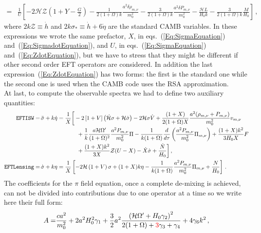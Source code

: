 \documentclass[prd,nofootinbib,showpacs]{revtex4}
\def\l{\left}
\def\r{\right}
\def\f{\frac}
\def\hub{{\mathcal H}}
\begin{document}
{\begin{align}
 =& \f{1}{U}\l[-2\hub\mathcal{Z}\l(1+Y-\f{G}{2}\r) -\f{1}{2(1+\Omega)k}\f{a^2\delta\rho_{m,\nu}}{m_0^2} -\f{3}{2(1+\Omega)k}\f{a^2\delta P_{m,\nu}}{m_0^2} -\f{\hub L}{H_0 k} -\f{3}{2(1+\Omega)k}\f{M}{H_0} \r] \label{Eq:ZdotEquation}\,,
\end{align}
%
where $2k\mathcal{Z}\equiv \dot{h}$ and $2k\sigma_*\equiv\dot{h}+6\dot{\eta}$ are the standard CAMB variables. 
In these expressions we wrote the same prefactor, $X$, in eqs.~(\ref{Eq:SigmaEquation}) and~(\ref{Eq:SigmadotEquation}), and $U$, in eqs.~(\ref{Eq:SigmaEquation}) and~(\ref{Eq:ZdotEquation}), but we have to stress that they might be different if other second order EFT operators are considered.
In addition the last expression~(\ref{Eq:ZdotEquation}) has two forms: the first is the standard one while the second one is used when the CAMB code uses the RSA approximation.\\
At last, to compute the observable spectra we had to define two auxiliary quantities:
%
\begin{align}
\texttt{EFTISW} =& \,\ddot{\sigma} + k\dot{\eta} = \f{1}{X}\bigg[ -2\l[1+V \r]\l(\dot{\mathcal{H}}\sigma +\hub \dot{\sigma} \r) -2\hub \sigma \dot{V} +\f{\l(1+X \r)}{2(1+\Omega)X}\frac{a^2(\rho_{m,\nu}+P_{m,\nu})}{m_0^2}v_{m,\nu}  \nonumber\\
	& \hspace{2.3cm} +\frac{1}{k}\frac{a \mathcal{H} \Omega^\prime}{(1+\Omega)^2}\frac{a^2P_{m,\nu}}{m_0^2}\Pi -\frac{1}{k(1+\Omega)}\frac{d}{d\tau}\left(\frac{a^2P_{m,\nu}}{m_0^2}\Pi_{m,\nu} \right) +\f{(1+X)k^2}{3 H_0 X}F  \nonumber \\
	& \hspace{2.3cm} +\f{(1+X)k^2}{3 X}\mathcal{Z}(U-X) -\dot{X}\dot{\sigma} +\f{\dot{N}}{H_0} \bigg] \label{Eq:TTSource}\,,\\
%
\texttt{EFTLensing} =& \,\dot{\sigma} + k\eta = \f{1}{X}\l[ -2\mathcal{H}\l(1 + V\r)\sigma +(1+ X) k \eta -\frac{1}{k (1+ \Omega)}\frac{a^2 P_{m,\nu}}{m_0^2} \Pi_{m,\nu} +\f{N}{H_0} \r] \label{Eq:LensingSource}\,.
\end{align}
%
The coefficients for the $\pi$ field equation, once a complete de-mixing is achieved, can not be divided into contributions due to one operator at a time so we write here their full form:
%
\begin{align}
%
A =& \f{c a^2}{m_0^2}+2 a^2 H_0^2 \gamma_1 +\f{3}{2}a^2 \f{\l(\hub \Omega' + H_0\gamma_2 \r)^2}{2(1+\Omega) + \textcolor{red}{3}\gamma_3 +\gamma_4} + 4 \gamma_6 k^2 \,, \\
%
& \nonumber \\

\end{align}}
\end{document}
